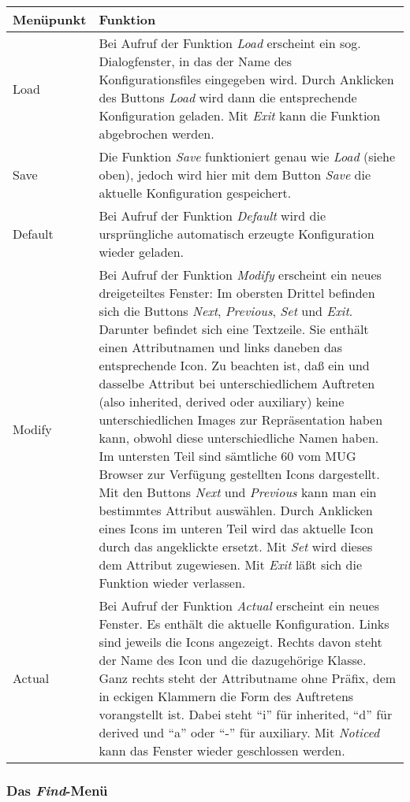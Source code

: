 \bigskip
\begin{tabular}{|l|p{10.2cm}|}
\hline
Men\"upunkt               & Funktion      \\
\hline
Load     &
Bei Aufruf der Funktion {\it Load} erscheint ein sog. Dialogfenster, in das der Name des Konfigurationsfiles eingegeben wird. Durch Anklicken des
Buttons {\it Load} wird dann die entsprechende Konfiguration geladen. Mit {\it Exit} kann die Funktion abgebrochen werden. \\ Save & Die Funktion
{\it Save} funktioniert genau wie {\it Load} (siehe oben), jedoch wird hier mit dem Button {\it Save} die aktuelle Konfiguration gespeichert. \\
Default & Bei Aufruf der Funktion {\it Default} wird die urspr\"ungliche automatisch erzeugte Konfiguration wieder geladen. \\ Modify & Bei Aufruf der
Funktion {\it Modify} erscheint ein neues dreigeteiltes Fenster: Im obersten Drittel befinden sich die Buttons {\it Next}, {\it Previous}, {\it Set}
und {\it Exit}. Darunter befindet sich eine Textzeile. Sie enth\"alt einen Attributnamen und links daneben das entsprechende Icon. Zu beachten ist, da\ss{}
ein und dasselbe Attribut bei unterschiedlichem Auftreten (also inherited, derived oder auxiliary) keine unterschiedlichen Images zur Repr\"asentation
haben kann, obwohl diese unterschiedliche Namen haben. Im untersten Teil sind s\"amtliche 60 vom MUG Browser zur Verf\"ugung gestellten Icons dargestellt.
Mit den Buttons {\it Next} und {\it Previous} kann man ein bestimmtes Attribut ausw\"ahlen. Durch Anklicken eines Icons im unteren Teil wird das
aktuelle Icon durch das angeklickte ersetzt. Mit {\it Set} wird dieses dem Attribut zugewiesen. Mit {\it Exit} l\"a\ss{}t sich die Funktion wieder
verlassen. \\ Actual & Bei Aufruf der Funktion {\it Actual} erscheint ein neues Fenster. Es enth\"alt die aktuelle Konfiguration. Links sind jeweils die
Icons angezeigt. Rechts davon steht der Name des Icon und die dazugeh\"orige Klasse. Ganz rechts steht der Attributname ohne Pr\"afix, dem in eckigen
Klammern die Form des Auftretens vorangstellt ist. Dabei steht "`i"' f\"ur inherited, "`d"' f\"ur derived und "`a"' oder "`-"' f\"ur auxiliary. Mit {\it Noticed}
kann das Fenster wieder geschlossen werden. \\
\hline \end{tabular}

\subsubsection{Das {\it Find}-Men\"u}

